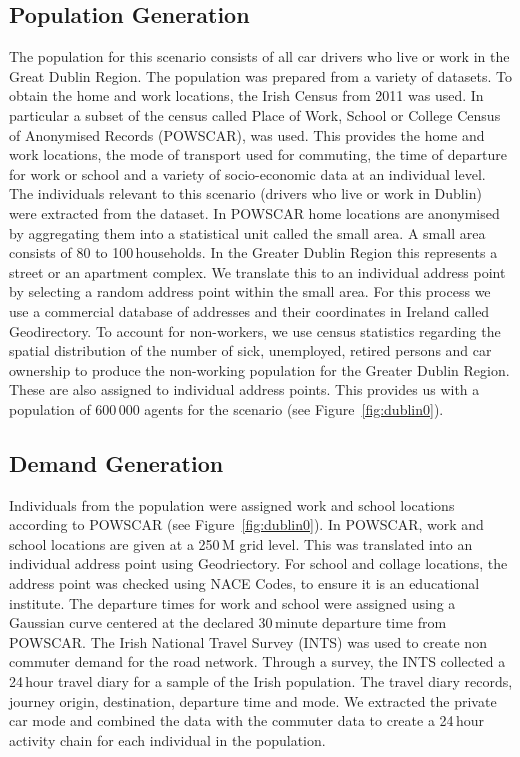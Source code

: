\subsection{Population Generation}
The population for this scenario consists of all car drivers who live or work in the Great Dublin Region. The population was prepared from a variety of datasets. To obtain the home and work locations, the Irish Census from 2011 was used. In particular a subset of the census called Place of Work, School or College Census of Anonymised Records (POWSCAR), was used. This provides the home and work locations, the mode of transport used for commuting, the time of departure for work or school and a variety of socio-economic data at an individual level. The individuals relevant to this scenario (drivers who live or work in Dublin) were extracted from the dataset. In POWSCAR home locations are anonymised by aggregating them into a statistical unit called the small area. A small area consists of 80 to 100\,households.  In the Greater Dublin Region this represents a street or an apartment complex.  We translate this to an individual address point by selecting a random address point within the small area.  For this process we use a commercial database of addresses and their coordinates in Ireland called Geodirectory. To account for non-workers, we use census statistics regarding the spatial distribution of the number of sick, unemployed, retired persons and car ownership to produce the non-working population for the Greater Dublin Region.  These are also assigned to individual address points. This provides us with a population of 600\,000 agents for the scenario (see Figure~\ref{fig:dublin0}).

\subsection{Demand Generation}
Individuals from the population were assigned work and school locations according to POWSCAR (see Figure~\ref{fig:dublin0}). In POWSCAR, work and school locations are given at a 250\,M grid level. This was translated into an individual address point using Geodriectory. For school and collage locations, the address point was checked using NACE Codes, to ensure it is an educational institute. The departure times for work  and school were assigned using a Gaussian curve centered at the declared 30\,minute departure time from POWSCAR. The Irish National Travel Survey (INTS) was used to create non commuter demand for the road network. Through a survey, the INTS collected a 24\,hour travel diary for a sample of the Irish population. The travel diary records, journey origin, destination, departure time and mode. We extracted the private car mode and combined the data with the commuter data to create a 24\,hour activity chain for each individual in the population.

